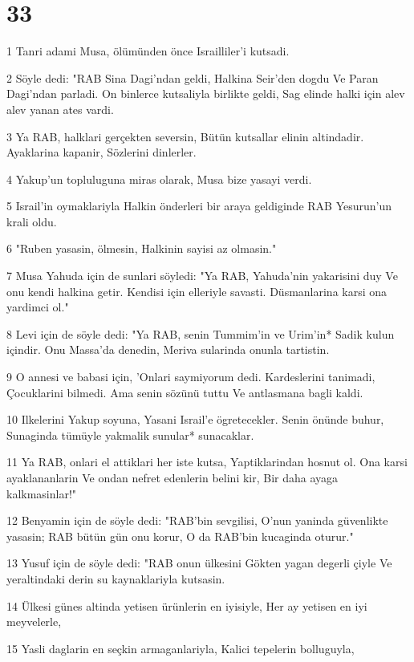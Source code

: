 \chapter{33}

\par 1 Tanri adami Musa, ölümünden önce Israilliler'i kutsadi.
\par 2 Söyle dedi: "RAB Sina Dagi'ndan geldi, Halkina Seir'den dogdu Ve Paran Dagi'ndan parladi. On binlerce kutsaliyla birlikte geldi, Sag elinde halki için alev alev yanan ates vardi.
\par 3 Ya RAB, halklari gerçekten seversin, Bütün kutsallar elinin altindadir. Ayaklarina kapanir, Sözlerini dinlerler.
\par 4 Yakup'un topluluguna miras olarak, Musa bize yasayi verdi.
\par 5 Israil'in oymaklariyla Halkin önderleri bir araya geldiginde RAB Yesurun'un krali oldu.
\par 6 "Ruben yasasin, ölmesin, Halkinin sayisi az olmasin."
\par 7 Musa Yahuda için de sunlari söyledi: "Ya RAB, Yahuda'nin yakarisini duy Ve onu kendi halkina getir. Kendisi için elleriyle savasti. Düsmanlarina karsi ona yardimci ol."
\par 8 Levi için de söyle dedi: "Ya RAB, senin Tummim'in ve Urim'in* Sadik kulun içindir. Onu Massa'da denedin, Meriva sularinda onunla tartistin.
\par 9 O annesi ve babasi için, 'Onlari saymiyorum dedi. Kardeslerini tanimadi, Çocuklarini bilmedi. Ama senin sözünü tuttu Ve antlasmana bagli kaldi.
\par 10 Ilkelerini Yakup soyuna, Yasani Israil'e ögretecekler. Senin önünde buhur, Sunaginda tümüyle yakmalik sunular* sunacaklar.
\par 11 Ya RAB, onlari el attiklari her iste kutsa, Yaptiklarindan hosnut ol. Ona karsi ayaklananlarin Ve ondan nefret edenlerin belini kir, Bir daha ayaga kalkmasinlar!"
\par 12 Benyamin için de söyle dedi: "RAB'bin sevgilisi, O'nun yaninda güvenlikte yasasin; RAB bütün gün onu korur, O da RAB'bin kucaginda oturur."
\par 13 Yusuf için de söyle dedi: "RAB onun ülkesini Gökten yagan degerli çiyle Ve yeraltindaki derin su kaynaklariyla kutsasin.
\par 14 Ülkesi günes altinda yetisen ürünlerin en iyisiyle, Her ay yetisen en iyi meyvelerle,
\par 15 Yasli daglarin en seçkin armaganlariyla, Kalici tepelerin bolluguyla,
